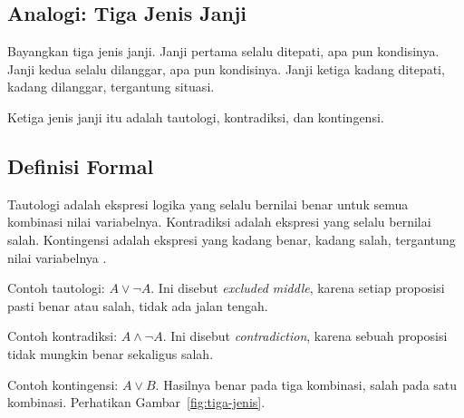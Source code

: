 \documentclass[11pt,a4paper]{article}
\begin{document}
\subsection{Analogi: Tiga Jenis Janji}

Bayangkan tiga jenis janji. Janji pertama selalu ditepati, apa pun kondisinya. Janji kedua selalu dilanggar, apa pun kondisinya. Janji ketiga kadang ditepati, kadang dilanggar, tergantung situasi.

Ketiga jenis janji itu adalah tautologi, kontradiksi, dan kontingensi.

\subsection{Definisi Formal}

Tautologi adalah ekspresi logika yang selalu bernilai benar untuk semua kombinasi nilai variabelnya. Kontradiksi adalah ekspresi yang selalu bernilai salah. Kontingensi adalah ekspresi yang kadang benar, kadang salah, tergantung nilai variabelnya \cite{rosen}.

Contoh tautologi: $A \vee \neg A$. Ini disebut \textit{excluded middle}, karena setiap proposisi pasti benar atau salah, tidak ada jalan tengah.

Contoh kontradiksi: $A \wedge \neg A$. Ini disebut \textit{contradiction}, karena sebuah proposisi tidak mungkin benar sekaligus salah.

Contoh kontingensi: $A \vee B$. Hasilnya benar pada tiga kombinasi, salah pada satu kombinasi. Perhatikan Gambar~\ref{fig:tiga-jenis}.
\end{document}
